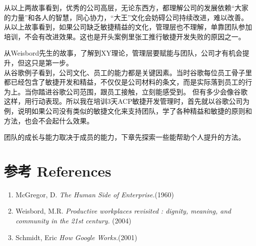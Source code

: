 

从以上两故事看到，优秀的公司高层，无论东西方，都理解公司的发展依赖``大家的力量''和各人的智慧，同心协力，``大王''文化会妨碍公司持续改进，难以改善。从以上故事看到，如果公司缺乏敏捷精益的文化，管理层也不理解，单靠团队参加培训，不会有改进效果。这也是开头案例里张工推行敏捷开发失败的原因之一。

从Weisbord先生的故事，了解到XY理论，管理层要赋能与团队，公司才有机会提升，但这只是第一步。\\
从谷歌例子看到，公司文化、员工的能力都是关键因素。当时谷歌每位员工骨子里都已经包含了敏捷开发和精益，不仅仅是公司材料的条文，而是实际落到员工的行为上。当你踏进谷歌公司范围，跟员工接触，立刻能感受到。
但有多少会像谷歌这样，用行动表现。所以我在培训3天ACP敏捷开发管理时，首先就以谷歌公司为例，说明如果公司没有类似的敏捷文化来支持团队，学了各种精益和敏捷的原则和方法，也会不会起什么效果。

团队的成长与能力取决于成员的能力，下章先探索一些能帮助个人提升的方法。

\hypertarget{ux53c2ux8003-references}{%
\section{参考 References}\label{ux53c2ux8003-references}}

\begin{enumerate}
\tightlist
\item
  McGregor, D. \emph{The Human Side of Enterprise.}(1960)\\
\item
  Weisbord, M.R. \emph{Productive workplaces revisited : dignity,
  meaning, and community in the 21st century.} (2004)
\item
  Schmidt, Eric \emph{How Google Works.}(2001)\\
\end{enumerate}



